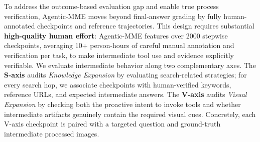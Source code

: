 \documentclass[runningheads]{llncs}
\theoremstyle{plain}
\theoremstyle{definition}
\theoremstyle{remark}
\begin{document}
To address the outcome-based evaluation gap and enable true process verification, Agentic-MME moves beyond final-answer grading by fully human-annotated checkpoints and reference trajectories. This design requires substantial \textbf{high-quality human effort}: Agentic-MME features over 2000 stepwise checkpoints, averaging {10+ person-hours} of careful manual annotation and verification per task, to make intermediate tool use and evidence explicitly verifiable.
We evaluate intermediate behavior along two complementary axes. The \textbf{S-axis} audits \textit{Knowledge Expansion} by evaluating search-related strategies; for every search hop, we associate checkpoints with human-verified keywords, reference URLs, and expected intermediate answers.
The \textbf{V-axis} audits \textit{Visual Expansion} by checking both the proactive intent to invoke tools and whether intermediate artifacts genuinely contain the required visual cues. Concretely, each V-axis checkpoint is paired with a targeted question and ground-truth intermediate processed images.
\end{document}
